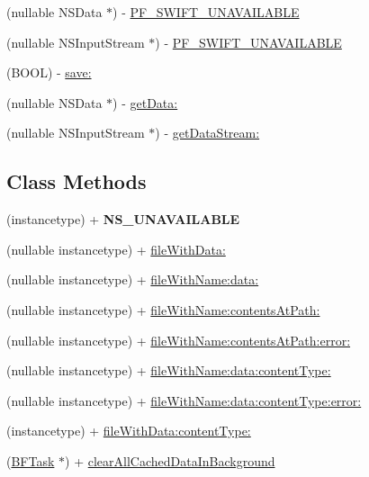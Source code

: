 \begin{DoxyCompactItemize}
\begin{DoxyCompactList}
 \end{DoxyCompactList}\item 
(nullable N\+S\+Data $\ast$) -\/ \hyperlink{interface_p_f_file_a9d978a0459e46f7e222acb5c1b51aadc}{P\+F\+\_\+\+S\+W\+I\+F\+T\+\_\+\+U\+N\+A\+V\+A\+I\+L\+A\+B\+L\+E}
\item 
(nullable N\+S\+Input\+Stream $\ast$) -\/ \hyperlink{interface_p_f_file_a5cdd02be0cf64455772f9b029babb55e}{P\+F\+\_\+\+S\+W\+I\+F\+T\+\_\+\+U\+N\+A\+V\+A\+I\+L\+A\+B\+L\+E}
\item 
(B\+O\+O\+L) -\/ \hyperlink{interface_p_f_file_afee8cdeae2851aaebbe594020a5dd949}{save\+:}
\item 
(nullable N\+S\+Data $\ast$) -\/ \hyperlink{interface_p_f_file_a26da7ff9282b86024a4e358fe2489c6d}{get\+Data\+:}
\item 
(nullable N\+S\+Input\+Stream $\ast$) -\/ \hyperlink{interface_p_f_file_ac09f2a8585972f12be2f80d9d00dc0c5}{get\+Data\+Stream\+:}
\end{DoxyCompactItemize}
\subsection*{Class Methods}
\begin{DoxyCompactItemize}
\item 
\hypertarget{interface_p_f_file_a36488794cc902f598d88bcc87e06fc57}{}(instancetype) + {\bfseries N\+S\+\_\+\+U\+N\+A\+V\+A\+I\+L\+A\+B\+L\+E}\label{interface_p_f_file_a36488794cc902f598d88bcc87e06fc57}

\item 
(nullable instancetype) + \hyperlink{interface_p_f_file_aaf9a35165dbb127b11b0e7245db5e332}{file\+With\+Data\+:}
\item 
(nullable instancetype) + \hyperlink{interface_p_f_file_a4ba7db4535e2a2148e2abe7f4d039d71}{file\+With\+Name\+:data\+:}
\item 
(nullable instancetype) + \hyperlink{interface_p_f_file_ad2e14fa677ebc9816e435ac3c68918f3}{file\+With\+Name\+:contents\+At\+Path\+:}
\item 
(nullable instancetype) + \hyperlink{interface_p_f_file_a2383de536e028018f9b85a2215bbea2e}{file\+With\+Name\+:contents\+At\+Path\+:error\+:}
\item 
(nullable instancetype) + \hyperlink{interface_p_f_file_a7072557533b069e72df8ca30d270379e}{file\+With\+Name\+:data\+:content\+Type\+:}
\item 
(nullable instancetype) + \hyperlink{interface_p_f_file_a023d8ea7794f342c0ef7983ed86ba2ab}{file\+With\+Name\+:data\+:content\+Type\+:error\+:}
\item 
(instancetype) + \hyperlink{interface_p_f_file_af95ac692fc7c6cec00e975ccafe4b0c3}{file\+With\+Data\+:content\+Type\+:}
\item 
(\hyperlink{class_b_f_task}{B\+F\+Task} $\ast$) + \hyperlink{interface_p_f_file_a2b9c05e81629a425c40239a5586415f3}{clear\+All\+Cached\+Data\+In\+Background}
\end{DoxyCompactItemize}
